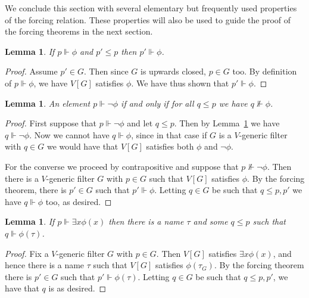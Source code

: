 \documentclass[11pt,oneside]{amsbook}
\newcommand{\forces}{\Vdash}
\theoremstyle{definition}
\theoremstyle{plain}
\newtheorem{lemma}[theorem]{Lemma}
\theoremstyle{definition}
\theoremstyle{remark}
\numberwithin{equation}{section}
\numberwithin{figure}{section}
\begin{document}
We conclude this section with several elementary but frequently used properties of the forcing relation. These properties will also be used to guide the proof of the forcing theorems in the next section.

\begin{lemma}
  \label{lem:forcing-downward}
  If $p\forces\phi$ and $p'\leq p$ then $p'\forces\phi$.
\end{lemma}

\begin{proof}
  Assume $p'\in G$. Then since $G$ is upwards closed, $p\in G$ too. By definition of $p\forces\phi$, we have $V[G]$ satisfies $\phi$. We have thus shown that $p'\forces\phi$.
\end{proof}

\begin{lemma}
  An element $p\forces\neg\phi$ if and only if for all $q\leq p$ we have $q\not\forces\phi$.
\end{lemma}

\begin{proof}
  First suppose that $p\forces\neg\phi$ and let $q\leq p$. Then by Lemma~\ref{lem:forcing-downward} we have $q\forces\neg\phi$. Now we cannot have $q\forces\phi$, since in that case if $G$ is a $V$-generic filter with $q\in G$ we would have that $V[G]$ satisfies both $\phi$ and $\neg\phi$.

  For the converse we proceed by contrapositive and suppose that $p\not\forces\neg\phi$. Then there is a $V$-generic filter $G$ with $p\in G$ such that $V[G]$ satisfies $\phi$. By the forcing theorem, there is $p'\in G$ such that $p'\forces\phi$. Letting $q\in G$ be such that $q\leq p,p'$ we have $q\forces\phi$ too, as desired.
\end{proof}

\begin{lemma}
  \label{lem:forcing-exists}
  If $p\forces\exists x\phi(x)$ then there is a name $\tau$ and some $q\leq p$ such that $q\forces\phi(\tau)$.
\end{lemma}

\begin{proof}
  Fix a $V$-generic filter $G$ with $p\in G$. Then $V[G]$ satisfies $\exists x\phi(x)$, and hence there is a name $\tau$ such that $V[G]$ satisfies $\phi(\tau_G)$. By the forcing theorem there is $p'\in G$ such that $p'\forces\phi(\tau)$. Letting $q\in G$ be such that $q\leq p,p'$, we have that $q$ is as desired.
\end{proof}
\end{document}

